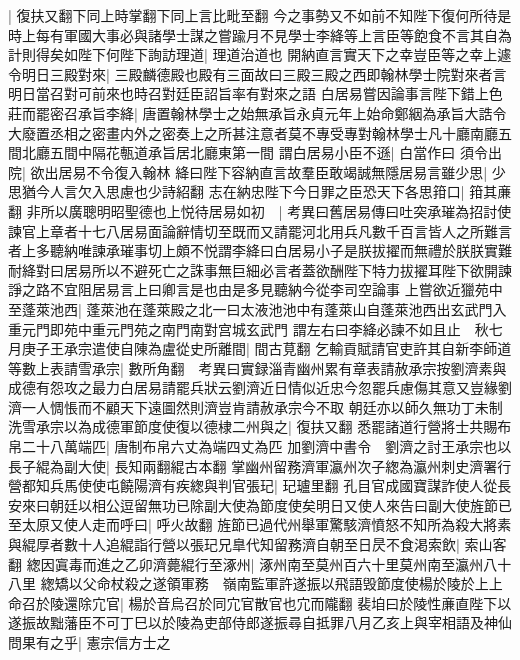 |{
	復扶又翻下同上時掌翻下同上言比毗至翻}
今之事勢又不如前不知陛下復何所待是時上每有軍國大事必與諸學士謀之嘗踰月不見學士李絳等上言臣等飽食不言其自為計則得矣如陛下何陛下詢訪理道|{
	理道治道也}
開納直言實天下之幸豈臣等之幸上遽令明日三殿對來|{
	三殿麟德殿也殿有三面故曰三殿三殿之西即翰林學士院對來者言明日當召對可前來也時召對廷臣詔旨率有對來之語}
白居易嘗因論事言陛下錯上色莊而罷密召承旨李絳|{
	唐置翰林學士之始無承旨永貞元年上始命鄭絪為承旨大誥令大廢置丞相之密畫内外之密奏上之所甚注意者莫不專受專對翰林學士凡十廳南廳五間北廳五間中隔花甎道承旨居北廳東第一間}
謂白居易小臣不遜|{
	白當作曰}
須令出院|{
	欲出居易不令復入翰林}
絳曰陛下容納直言故羣臣敢竭誠無隱居易言雖少思|{
	少思猶今人言欠入思慮也少詩紹翻}
志在納忠陛下今日罪之臣恐天下各思箝口|{
	箝其亷翻}
非所以廣聰明昭聖德也上悦待居易如初　|{
	考異曰舊居易傳曰吐突承璀為招討使諫官上章者十七八居易面論辭情切至既而又請罷河北用兵凡數千百言皆人之所難言者上多聽納唯諫承璀事切上頗不悦謂李絳曰白居易小子是朕拔擢而無禮於朕朕實難耐絳對曰居易所以不避死亡之誅事無巨細必言者蓋欲酬陛下特力拔擢耳陛下欲開諫諍之路不宜阻居易言上曰卿言是也由是多見聽納今從李司空論事}
上嘗欲近獵苑中至蓬萊池西|{
	蓬萊池在蓬萊殿之北一曰太液池池中有蓬萊山自蓬萊池西出玄武門入重元門即苑中重元門苑之南門南對宫城玄武門}
謂左右曰李絳必諫不如且止　秋七月庚子王承宗遣使自陳為盧從史所離間|{
	間古莧翻}
乞輸貢賦請官吏許其自新李師道等數上表請雪承宗|{
	數所角翻　考異曰實録淄青幽州累有章表請赦承宗按劉濟素與成德有怨攻之最力白居易請罷兵狀云劉濟近日情似近忠今忽罷兵慮傷其意又豈緣劉濟一人惆悵而不顧天下遠圖然則濟豈肯請赦承宗今不取}
朝廷亦以師久無功丁未制洗雪承宗以為成德軍節度使復以德棣二州與之|{
	復扶又翻}
悉罷諸道行營將士共賜布帛二十八萬端匹|{
	唐制布帛六丈為端四丈為匹}
加劉濟中書令　劉濟之討王承宗也以長子緄為副大使|{
	長知兩翻緄古本翻}
掌幽州留務濟軍瀛州次子緫為瀛州刺史濟署行營都知兵馬使使屯饒陽濟有疾緫與判官張玘|{
	玘瓐里翻}
孔目官成國寶謀詐使人從長安來曰朝廷以相公逗留無功已除副大使為節度使矣明日又使人來告曰副大使旌節已至太原又使人走而呼曰|{
	呼火故翻}
旌節已過代州舉軍驚駭濟憤怒不知所為殺大將素與緄厚者數十人追緄詣行營以張玘兄臯代知留務濟自朝至日昃不食渇索飲|{
	索山客翻}
緫因寘毒而進之乙卯濟薨緄行至涿州|{
	涿州南至莫州百六十里莫州南至瀛州八十八里}
緫矯以父命杖殺之遂領軍務　嶺南監軍許遂振以飛語毁節度使楊於陵於上上命召於陵還除宂官|{
	楊於音烏召於同宂官散官也宂而隴翻}
裴垍曰於陵性亷直陛下以遂振故黜藩臣不可丁巳以於陵為吏部侍郎遂振尋自抵罪八月乙亥上與宰相語及神仙問果有之乎|{
	憲宗信方士之}



